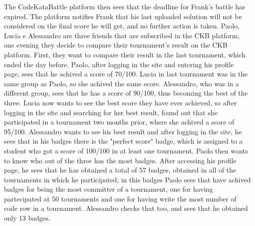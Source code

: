 \documentclass{article}
\newcounter{subsubsubsection}[subsubsection]
\begin{document}
{                The CodeKataBattle platform then sees that the deadline for Frank's battle has expired. The platform notifies Frank that his last uploaded solution will not be considered on the final score he will get, and no further action is taken.
                Paolo, Lucia e Alessandro are three friends that are subscribed in the CKB platform, one evening they decide to compare their tournament's result on the CKB platform. First, they want to compare their result in the last tournament, which ended the day before. 
                Paolo, after logging in the site and entering his profile page, sees that he achived a score of 70/100. Lucia in last tournament was in the same group as Paolo, so she achived the same score. Alessandro, who was in a different group, sees that he has a score of 90/100, thus becoming the best of the three. Lucia now wants to see the best score they have ever achieved, so after logging in the site and searching for her best result, found out that she participated in a tournament two months prior, where she achived a score of 95/100. Alessandro wants to see his best result and after logging in the site, he sees that in his badges there is the "perfect score" badge, which is assigned to a student who got a score of 100/100 in at least one tournament.
                Paolo then wants to know who out of the three has the most badges. After accessing his profile page, he sees that he has obtained a total of 57 badges, obtained in all of the tournaments in which he participated; in this badges Paolo sees that have achived badges for being the most committer of a tournament, one for having partecipated at 50 tournaments and one for having write the most number of code row in a tournament. Alessandro checks that too, and sees that he obtained only 13 badges.
}
\end{document}
